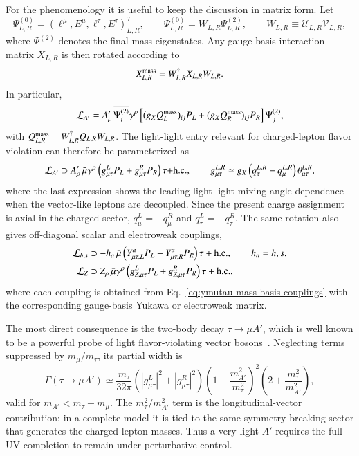 \documentclass[onecolumn, aps, nofootinbib, prd, preprint, floats, floatfix, amsmath, amssymb, superscriptaddress, preprintnumbers]{revtex4-1}
\begin{document}
For the phenomenology it is useful to keep the discussion in matrix form. Let
\begin{equation}
\Psi^{(0)}_{L,R}=(\ell^\mu,E^\mu,\ell^\tau,E^\tau)_{L,R}^{T},\qquad
\Psi^{(0)}_{L,R}=W_{L,R}\Psi^{(2)}_{L,R},\qquad
W_{L,R}\equiv\mathcal{U}_{L,R}\mathcal{V}_{L,R},
\end{equation}
where \(\Psi^{(2)}\) denotes the final mass eigenstates. Any gauge-basis interaction matrix \(X_{L,R}\) is then rotated according to
\begin{equation}
X_{L,R}^{\rm mass}=W_{L,R}^\dagger X_{L,R}W_{L,R}.
\label{eq:ymutau-mass-basis-couplings}
\end{equation}
In particular,
\begin{equation}
\mathcal{L}_{A'}=
A'_\rho\,\overline{\Psi^{(2)}_i}\gamma^\rho
\left[(g_X Q_L^{\rm mass})_{ij}P_L+(g_X Q_R^{\rm mass})_{ij}P_R\right]\Psi^{(2)}_j ,
\label{eq:ymutau-aprime-couplings}
\end{equation}
with \(Q_{L,R}^{\rm mass}=W_{L,R}^\dagger Q_{L,R}W_{L,R}\). The light-light entry relevant for charged-lepton flavor violation can therefore be parameterized as
\begin{equation}
\mathcal{L}_{A'}\supset
A'_\rho\,\bar\mu\gamma^\rho
\left(g_{\mu\tau}^{L}P_L+g_{\mu\tau}^{R}P_R\right)\tau
{\rm +h.c.},
\qquad
g_{\mu\tau}^{L,R}\simeq
g_X\left(q_{\tau}^{L,R}-q_{\mu}^{L,R}\right)\theta_{\mu\tau}^{L,R},
\label{eq:ymutau-lfv-aprime}
\end{equation}
where the last expression shows the leading light-light mixing-angle dependence when the vector-like leptons are decoupled. Since the present charge assignment is axial in the charged sector, \(q_\mu^L=-q_\mu^R\) and \(q_\tau^L=-q_\tau^R\). The same rotation also gives off-diagonal scalar and electroweak couplings,
\begin{align}
\mathcal{L}_{h,s}&\supset
-h_a\,\bar\mu\left(Y^{a}_{\mu\tau,L}P_L+Y^{a}_{\mu\tau,R}P_R\right)\tau+{\rm h.c.},
\qquad h_a=h,s,\\
\mathcal{L}_{Z}&\supset
Z_\rho\,\bar\mu\gamma^\rho
\left(g_{Z,\mu\tau}^{L}P_L+g_{Z,\mu\tau}^{R}P_R\right)\tau+{\rm h.c.},
\end{align}
where each coupling is obtained from Eq.~\eqref{eq:ymutau-mass-basis-couplings} with the corresponding gauge-basis Yukawa or electroweak matrix.

The most direct consequence is the two-body decay \(\tau\to\mu A'\), which is well known to be a powerful probe of light flavor-violating vector bosons~\cite{Heeck:2016xkh,Ibarra:2021aon}. Neglecting terms suppressed by \(m_\mu/m_\tau\), its partial width is
\begin{equation}
\Gamma(\tau\to\mu A')\simeq
\frac{m_\tau}{32\pi}
\left(|g_{\mu\tau}^{L}|^2+|g_{\mu\tau}^{R}|^2\right)
\left(1-\frac{m_{A'}^2}{m_\tau^2}\right)^2
\left(2+\frac{m_\tau^2}{m_{A'}^2}\right),
\label{eq:tau-mu-aprime-width}
\end{equation}
valid for \(m_{A'}<m_\tau-m_\mu\). The \(m_\tau^2/m_{A'}^2\) term is the longitudinal-vector contribution; in a complete model it is tied to the same symmetry-breaking sector that generates the charged-lepton masses. Thus a very light \(A'\) requires the full UV completion to remain under perturbative control.
\end{document}
